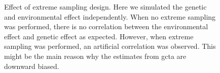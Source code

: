 	\begin{figure}[t]
		\centering
		\caption[Effect of Extreme Sampling Design]
		{Effect of extreme sampling design.
			Here we simulated the genetic and environmental effect independently.
			When no extreme sampling was performed, there is no correlation between the environmental effect and genetic effect as expected.
			However, when extreme sampling was performed, an artificial correlation was observed.
			This might be the main reason why the estimates from \gls{gcta} are downward biased.
		} 
		\label{fig:extremeSampling}
	\end{figure}
	
